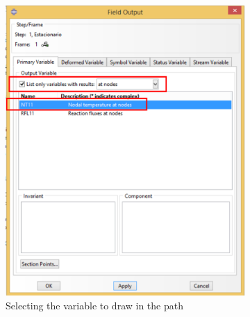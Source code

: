 \begin{itemize}
\begin{figure}[!h]
\begin{subfigure}[!h]{0.33\textwidth}
      \includegraphics[width=\textwidth]{./body/images/post32.pdf}
      \caption{Selecting the variable to draw in the path}
      \label{post32}
    \end{subfigure}%
    \begin{subfigure}[!h]{0.33\textwidth}

\end{subfigure}
\end{figure}
\end{itemize}
